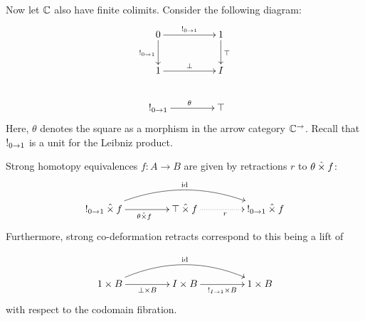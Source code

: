 \documentclass[reqno,10pt,a4paper,oneside]{amsart}
\begin{document}
\begin{comment}
\begin{example}
\label{de-morgan-exp-deformation-retract}
Let $I$ have the structure of a De Morgan algebra in $\catC$.
For any object $A$, the section-retraction pair $A^{\canonical_{I \to 1}} : A^1 \to A^I$ and $A^{\top} : A^I \to A^1$ forms a strong and co-strong deformation retract.
The same holds with $\top$ replaced by $\bot$.
\end{example}

\begin{proof}
Combine \cref{de-morgan-deformation-retract} with \cref{h-equiv-exponent}.
\end{proof}
\end{comment}

Now let $\mathbb{C}$ also have finite colimits.
Consider the following diagram:
\[
\xymatrix@C+2em{
  0
  \ar[r]^{\canonical_{0 \to 1}}
  \ar[d]_{\canonical_{0 \to 1}}
&
  1
  \ar[d]^{\top}
\\
  1
  \ar[r]^{\bot}
&
  I
\\
  \canonical_{0 \to 1}
  \ar[r]^{\theta}
&
  \top
}
\]
Here, $\theta$ denotes the square as a morphism in the arrow category $\mathbb{C}^{\to}$.
Recall that $\mathord{!}_{0 \to 1}$ is a unit for the Leibniz product. 

\begin{lemma}
\label{strong-h-equiv-as-retraction}
Strong homotopy equivalences $f : A \to B$ are given by retractions $r$ to $\theta \mathbin{\hat{\times}} f$:
\[
\xymatrix@C+2em{
  \canonical_{0 \to 1} \hattimes f
  \ar[r]_{\theta \hattimes f}
  \ar@/^2em/[rr]^{\id}
&
  \top \hattimes f
  \ar@{.>}[r]_{r}
&
  \canonical_{0 \to 1} \hattimes f
}
\]
Furthermore, strong co-deformation retracts correspond to this being a lift of

\[
\xymatrix@C+2em{
  1 \times B
  \ar[r]_{\bot \times B}
  \ar@/^2em/[rr]^{\id}
&
  I \times B
  \ar[r]_{\canonical_{I \to 1} \times B}
&
  1 \times B
}
\]
with respect to the codomain fibration.
\end{lemma}
\end{document}
